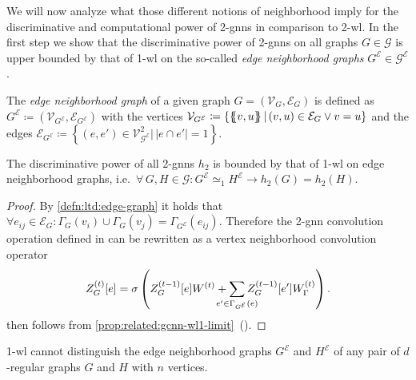 We will now analyze what those different notions of neighborhood imply for the discriminative and computational power of 2-\acsp{gnn} in comparison to 2-\acs{wl}.
In the first step we show that the discriminative power of 2-\acsp{gnn} on all graphs $G \in \mathcal{G}$ is upper bounded by that of 1-\acs{wl} on the so-called \textit{edge neighborhood graphs} $G^{\mathcal{E}} \in \mathcal{G}^{\mathcal{E}}$.
\begin{defn}\label{defn:ltd:edge-graph}
	The \textit{edge neighborhood graph} of a given graph $G = (\mathcal{V}_G, \mathcal{E}_G)$ is defined as $G^{\mathcal{E}} \coloneqq (\mathcal{V}_{G^{\mathcal{E}}}, \mathcal{E}_{G^{\mathcal{E}}})$ with the vertices $\mathcal{V}_{G^{\mathcal{E}}} \coloneqq \{ \ldblbrace v, u \rdblbrace\, |\, (v, u) \in \mathcal{E}_G \lor v = u \}$ and the edges $\mathcal{E}_{G^{\mathcal{E}}} \coloneqq \left\{ (e, e') \in \mathcal{V}_{\mathcal{G}^{\mathcal{E}}}^2 |\, \left|e \cap e'\right| = 1 \right\}$. %
\end{defn}
\begin{prop}\label{prop:ltd:2gnn-wl1-limit}
	The discriminative power of all 2-\acsp{gnn} $h_2$ is bounded by that of 1-\ac{wl} on edge neighborhood graphs, i.e.\ $\forall\, G, H \in \mathcal{G}: G^{\mathcal{E}} \mathrel{\simeq_1} H^{\mathcal{E}} \rightarrow h_2(G) = h_2(H)$. %
\end{prop}
\begin{proof}
	By \cref{defn:ltd:edge-graph} it holds that $\forall e_{ij} \in \mathcal{E}_G: {\Gamma_G(v_i) \cup \Gamma_G(v_j)} = \Gamma_{G^{\mathcal{E}}}(e_{ij})$.
	Therefore the 2-\acs{gnn} convolution operation defined in  can be rewritten as a vertex neighborhood convolution operator
	\begin{align*}
		Z_G^{(t)}[e] = \sigma\left( Z_G^{(t-1)}[e] W^{(t)} + \smashoperator[lr]{\sum_{e' \in \Gamma_{G^{\mathcal{E}}}(e)}} Z_G^{(t-1)}[e'] W_{\Gamma}^{(t)} \right)
		\text{.}
	\end{align*}
	 then follows from \cref{prop:related:gcnn-wl1-limit}~().
\end{proof}
\begin{lem}\label{lem:ltd:wl1-regular-edge-neighbor-limit}
	1-\ac{wl} cannot distinguish the edge neighborhood graphs $G^{\mathcal{E}}$ and $H^{\mathcal{E}}$ of any pair of $d$-regular graphs $G$ and $H$ with $n$ vertices.
\end{lem}
